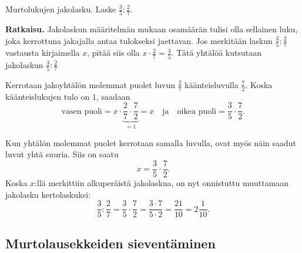 \begin{esimerkki}
Murtolukujen jakolasku. Laske $\frac 3 5 : \frac 2 7$.

\textbf{Ratkaisu.}
Jakolaskun määritelmän mukaan osamäärän tulisi olla sellainen luku, joka kerrottuna jakajalla antaa tulokseksi jaettavan. Jos merkitään laskun $\frac 3 5 : \frac 2 7$ vastausta kirjaimella $x$, pitää siis olla $x \cdot \frac 2 7 = \frac 3 5$.  Tätä yhtälöä kutsutaan jakolaskun $\frac 3 5 : \frac 2 7$ 

Kerrotaan jakoyhtälön molemmat puolet luvun $\frac 2 7$ käänteisluvulla $\frac 7 2$. Koska käänteislukujen tulo on $1$, saadaan
\[
	\text{vasen puoli} = x \cdot \underbrace{\frac 2 7 \cdot \frac 7 2}_{= 1} = x \quad \text{ja} \quad \text{oikea puoli} = \frac 3 5 \cdot \frac 7 2.
\]

Kun yhtälön molemmat puolet kerrotaan samalla luvulla, ovat myös näin saadut luvut yhtä suuria. Siis on saatu
\[
	x = \frac 3 5 \cdot \frac 7 2.
\]
Koska $x$:llä merkittiin alkuperäistä jakolaskua, on nyt onnistuttu muuttamaan jakolasku kertolaskuksi:
\[
	\frac 3 5 : \frac 2 7 = \frac 3 5 \cdot \frac 7 2 = \frac{3 \cdot 7}{5 \cdot 2} = \frac{21}{10} = 2 \frac{1}{10}.
\]
 \end{esimerkki}
 


    \subsection*{Murtolausekkeiden sieventäminen}


